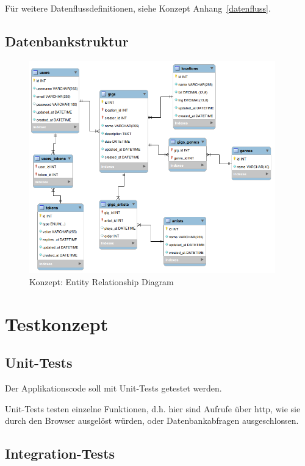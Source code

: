 Für weitere Datenflussdefinitionen, siehe Konzept Anhang~\ref{datenfluss}.

\clearpage
\subsection{Datenbankstruktur}

\begin{figure}[!htb]
  \centering
  \includegraphics[width=0.95\textwidth]{konzept/erd.png}
  \caption{Konzept: Entity Relationship Diagram}
\end{figure}

\clearpage
\section{Testkonzept}

\subsection{Unit-Tests}

Der Applikationscode soll mit Unit-Tests getestet werden.

Unit-Tests testen einzelne Funktionen, d.h. hier sind Aufrufe über \Gls{http}, wie
sie durch den Browser ausgelöst würden, oder Datenbankabfragen ausgeschlossen.

\subsection{Integration-Tests}

